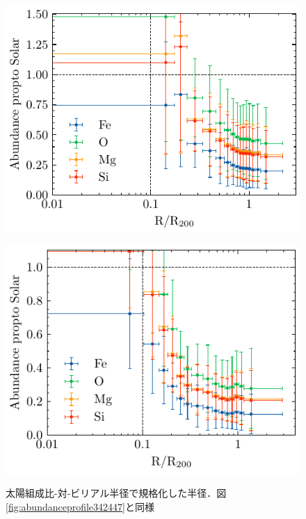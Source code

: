 \documentclass[main.tex]{subfiles}
\begin{document}
	\begin{figure}[htbp]
		\centering
		\begin{minipage}[b]{0.45\linewidth}
			\centering
			\includegraphics[width=\linewidth]{pic/abundance_profile388544}
			\label{fig:abundanceprofile388544}
		\end{minipage}
		\begin{minipage}[b]{0.45\linewidth}
			\centering
			\includegraphics[width=\linewidth]{pic/abundance_profile421555}
			\label{fig:abundanceprofile421555}
		\end{minipage}
		\caption{太陽組成比-対-ビリアル半径で規格化した半径．図\ref{fig:abundanceprofile342447}と同様}
		\label{fig:2radicalprofile}
	\end{figure}
	
\end{document}
